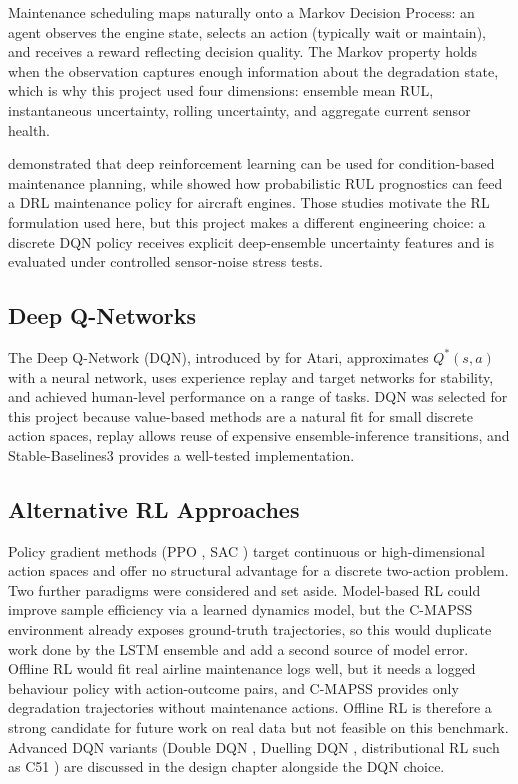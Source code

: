 \documentclass[12pt,a4paper]{report}
\begin{document}
Maintenance scheduling maps naturally onto a Markov Decision Process: an agent observes the engine state, selects an action (typically wait or maintain), and receives a reward reflecting decision quality. The Markov property holds when the observation captures enough information about the degradation state, which is why this project used four dimensions: ensemble mean RUL, instantaneous uncertainty, rolling uncertainty, and aggregate current sensor health.


\citet{zhang2019deep} demonstrated that deep reinforcement learning can be used for condition-based maintenance planning, while \citet{lee2023deep} showed how probabilistic RUL prognostics can feed a DRL maintenance policy for aircraft engines. Those studies motivate the RL formulation used here, but this project makes a different engineering choice: a discrete DQN policy receives explicit deep-ensemble uncertainty features and is evaluated under controlled sensor-noise stress tests.

\subsection{Deep Q-Networks}

The Deep Q-Network (DQN), introduced by \citet{mnih2015human} for Atari, approximates $Q^*(s,a)$ with a neural network, uses experience replay and target networks for stability, and achieved human-level performance on a range of tasks. DQN was selected for this project because value-based methods are a natural fit for small discrete action spaces, replay allows reuse of expensive ensemble-inference transitions, and Stable-Baselines3 \citep{raffin2021stable} provides a well-tested implementation.

\subsection{Alternative RL Approaches}

Policy gradient methods (PPO \citep{schulman2017proximal}, SAC \citep{haarnoja2018soft}) target continuous or high-dimensional action spaces and offer no structural advantage for a discrete two-action problem. Two further paradigms were considered and set aside. Model-based RL could improve sample efficiency via a learned dynamics model, but the C-MAPSS environment already exposes ground-truth trajectories, so this would duplicate work done by the LSTM ensemble and add a second source of model error. Offline RL \citep{levine2020offline} would fit real airline maintenance logs well, but it needs a logged behaviour policy with action-outcome pairs, and C-MAPSS provides only degradation trajectories without maintenance actions. Offline RL is therefore a strong candidate for future work on real data but not feasible on this benchmark. Advanced DQN variants (Double DQN \citep{vanhasselt2016deep}, Duelling DQN \citep{wang2016dueling}, distributional RL such as C51 \citep{bellemare2017distributional}) are discussed in the design chapter alongside the DQN choice.
\end{document}
